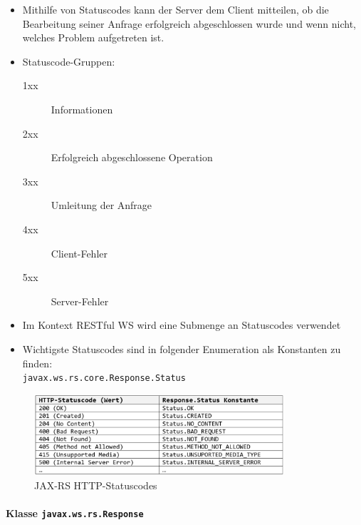 \documentclass[a4paper]{article}
\begin{document}
			\begin{itemize}
				\item Mithilfe von Statuscodes kann der Server dem Client mitteilen, ob die Bearbeitung seiner Anfrage erfolgreich abgeschlossen wurde und wenn nicht, welches Problem aufgetreten ist.
				\item Statuscode-Gruppen:
					\begin{description}
						\item[1xx] Informationen
						\item[2xx] Erfolgreich abgeschlossene Operation
						\item[3xx] Umleitung der Anfrage
						\item[4xx] Client-Fehler
						\item[5xx] Server-Fehler
					\end{description}
				\item Im Kontext RESTful WS wird eine Submenge an Statuscodes verwendet
				\item Wichtigste Statuscodes sind in folgender Enumeration als Konstanten zu finden:\\
				\texttt{javax.ws.rs.core.Response.Status}
			\end{itemize}
		
			\begin{figure}[!htb]
				\centering
				\includegraphics[keepaspectratio, height=3cm]{img/ws/statuscodes.png}
				\caption{JAX-RS HTTP-Statuscodes}
				\label{fig:statuscodes}
			\end{figure}
		
		\newpage
		
		\paragraph{Klasse \texttt{javax.ws.rs.Response}}
		
\end{document}
